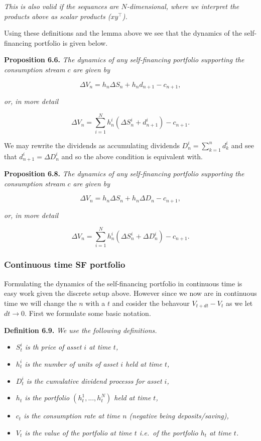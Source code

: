 \documentclass[
]{article}
\providecommand{\tightlist}{%
  \setlength{\itemsep}{0pt}\setlength{\parskip}{0pt}}
\begin{document}
\emph{This is also valid if the sequances are \(N\)-dimensional, where
we interpret the products above as scalar products (\(xy^\top\)).}

Using these definitions and the lemma above we see that the dynamics of
the self-financing portfolio is given below.

\textbf{Proposition 6.6.} \emph{The dynamics of any self-financing
portfolio supporting the consumption stream \(c\) are given by}

\[
\Delta V_n=h_n \Delta S_n+h_nd_{n+1}-c_{n+1},\tag{6.11}
\]

\emph{or, in more detail}

\[
\Delta V_n=\sum_{i=1}^Nh_n^i(\Delta S_n^i+d^i_{n+1})-c_{n+1}.\tag{6.12}
\]

We may rewrite the dividends as accumulating dividends
\(D^i_n=\sum_{k=1}^nd^i_k\) and see that \(d_{n+1}^i=\Delta D^i_n\) and
so the above condition is equivalent with.

\textbf{Proposition 6.8.} \emph{The dynamics of any self-financing
portfolio supporting the consumption stream \(c\) are given by}

\[
\Delta V_n=h_n \Delta S_n+h_n\Delta D_n-c_{n+1},\tag{6.15}
\]

\emph{or, in more detail}

\[
\Delta V_n=\sum_{i=1}^Nh_n^i(\Delta S_n^i+\Delta D^i_n)-c_{n+1}.\tag{6.16}
\]

\hypertarget{continuous-time-sf-portfolio}{%
\subsubsection{Continuous time SF
portfolio}\label{continuous-time-sf-portfolio}}

Formulating the dynamics of the self-financing portfolio in continuous
time is easy work given the discrete setup above. However since we now
are in continuous time we will change the \(n\) with a \(t\) and cosider
the behavour \(V_{t+dt}-V_t\) as we let \(dt\to 0\). First we formulate
some basic notation.

\textbf{Definition 6.9.} \emph{We use the following definitions.}

\begin{itemize}
\tightlist
\item
  \emph{\(S_t^i\) is th price of asset \(i\) at time \(t\),}
\item
  \emph{\(h_t^i\) is the number of units of asset \(i\) held at time
  \(t\),}
\item
  \emph{\(D_t^i\) is the cumulative dividend processs for asset \(i\),}
\item
  \emph{\(h_t\) is the portfolio \((h_t^1,...,h_t^N)\) held at time
  \(t\),}
\item
  \emph{\(c_t\) is the consumption rate at time \(n\) (negative being
  deposits/saving),}
\item
  \emph{\(V_t\) is the value of the portfolio at time \(t\) i.e.~of the
  portfolio \(h_t\) at time \(t\).}
\end{itemize}
\end{document}
